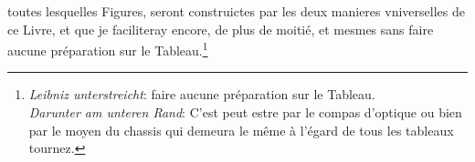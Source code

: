 \pend \pstart [p.~155] [...] toutes lesquelles Figures, seront construictes par les deux manieres vniverselles de ce Livre, et que je faciliteray encore, de plus de moiti\'{e}, et mesmes sans faire aucune pr\'{e}paration sur le Tableau.\footnote{\textit{Leibniz unterstreicht}: faire aucune pr\'{e}paration sur le Tableau.\\ \textit{Darunter am unteren Rand}: C'est peut estre par le compas d'optique\protect{} ou bien par le moyen du chassis qui demeura le même \`{a} l'\'{e}gard de tous les tableaux tournez.}